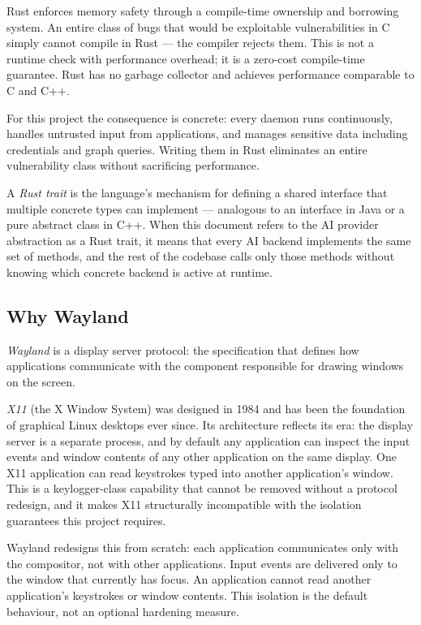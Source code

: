 Rust enforces memory safety through a compile-time ownership and borrowing
system. An entire class of bugs that would be exploitable vulnerabilities in C
simply cannot compile in Rust --- the compiler rejects them. This is not a
runtime check with performance overhead; it is a zero-cost compile-time
guarantee. Rust has no garbage collector and achieves performance comparable to
C and C++.

For this project the consequence is concrete: every daemon runs continuously,
handles untrusted input from applications, and manages sensitive data including
credentials and graph queries. Writing them in Rust eliminates an entire
vulnerability class without sacrificing performance.

A \emph{Rust trait} is the language's mechanism for defining a shared interface
that multiple concrete types can implement --- analogous to an interface in Java
or a pure abstract class in C++. When this document refers to the AI provider
abstraction as a Rust trait, it means that every AI backend implements the same
set of methods, and the rest of the codebase calls only those methods without
knowing which concrete backend is active at runtime.

\subsection{Why Wayland}
\label{sec:wayland-intro}

\emph{Wayland} is a display server protocol: the specification that defines how
applications communicate with the component responsible for drawing windows on
the screen.

\emph{X11} (the X Window System) was designed in 1984 and has been the
foundation of graphical Linux desktops ever since. Its architecture reflects its
era: the display server is a separate process, and by default any application
can inspect the input events and window contents of any other application on the
same display. One X11 application can read keystrokes typed into another
application's window. This is a keylogger-class capability that cannot be
removed without a protocol redesign, and it makes X11 structurally incompatible
with the isolation guarantees this project requires.

Wayland redesigns this from scratch: each application communicates only with the
compositor, not with other applications. Input events are delivered only to the
window that currently has focus. An application cannot read another
application's keystrokes or window contents. This isolation is the default
behaviour, not an optional hardening measure.

